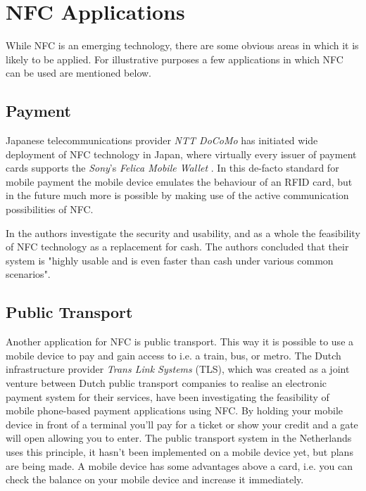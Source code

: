 \chapter{NFC Applications}
\label{chap:applications}

While NFC is an emerging technology, there are some obvious areas in which it is likely to be applied.
For illustrative purposes a few applications in which NFC can be used are mentioned below.



\section{Payment} 
Japanese telecommunications provider \textit{NTT DoCoMo} has initiated wide deployment of NFC technology in Japan, where virtually every issuer of payment cards supports the \textit{Sony}'s \textit{Felica Mobile Wallet} \cite{3g_japan}.
In this de-facto standard for mobile payment the mobile device emulates the behaviour of an RFID card, but in the future much more is possible by making use of the active communication possibilities of NFC. %

In \cite{1555846} the authors investigate the security and usability, and as a whole the feasibility of NFC technology as a replacement for cash.
The authors concluded that their system is "highly usable and is even faster than cash under various common scenarios".


\section{Public Transport}
Another application for NFC is public transport.
This way it is possible to use a mobile device to pay and gain access to i.e. a train, bus, or metro.
The Dutch infrastructure provider \textit{Trans Link Systems} (TLS), which was created as a joint venture between Dutch public transport companies to realise an electronic payment system for their services, have been investigating the feasibility of mobile phone-based payment applications using NFC. %
By holding your mobile device in front of a terminal you'll pay for a ticket or show your credit and a gate will open allowing you to enter.
The public transport system in the Netherlands uses this principle, it hasn't been implemented on a mobile device yet, but plans are being made. A mobile device has some advantages above a card, i.e. you can check the balance on your mobile device and increase it immediately. %

